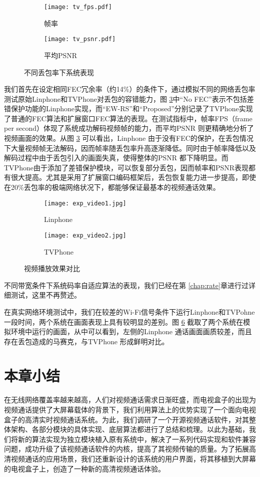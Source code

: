 \begin{figure}[htbp]
  \begin{subfigure}[b]{0.5\textwidth}
    \centering
    \texttt{[image: tv\_fps.pdf]}
    \caption{帧率}
    \label{pic:tv_fps}
  \end{subfigure}
  \begin{subfigure}[b]{0.5\textwidth}
    \centering
    \texttt{[image: tv\_psnr.pdf]}
    \caption{平均PSNR}
    \label{pic:tv_psnr}
  \end{subfigure}
  \caption{不同丢包率下系统表现}
  \label{fig:tv_loss}
\end{figure}

我们首先在设定相同FEC冗余率（约14\%）的条件下，通过模拟不同的网络丢包率测试原始Linphone和TVPhone对丢包的容错能力，图 \ref{fig:tv_loss}中``No FEC''表示不包括差错保护功能的Linphone实现，而``EW-RS''和``Proposed''分别记录了TVPhone实现了普通的FEC算法和扩展窗口FEC算法的表现。在测试指标中，帧率FPS（frame per second）体现了系统成功解码视频帧的能力，而平均PSNR 则更精确地分析了视频画面的效果。从图 \ref{fig:tv_loss} 可以看出，Linphone 由于没有FEC的保护，在丢包情况下大量视频帧无法解码，因而帧率随丢包率升高逐渐降低。同时由于帧率降低以及解码过程中由于丢包引入的画面失真，使得整体的PSNR 都下降明显。而TVPhone由于添加了差错保护模块，可以恢复部分丢包，因而帧率和PSNR表现都有很大提高。尤其是采用了扩展窗口编码框架后，丢包恢复能力进一步提高，即使在20\%丢包率的极端网络状况下，都能够保证最基本的视频通话效果。

\begin{figure}[htbp]
  \begin{subfigure}[b]{0.5\textwidth}
    \centering
    \texttt{[image: exp\_video1.jpg]}
    \caption{Linphone}
    \label{pic:tv_fps}
  \end{subfigure}
  \begin{subfigure}[b]{0.5\textwidth}
    \centering
    \texttt{[image: exp\_video2.jpg]}
    \caption{TVPhone}
    \label{pic:tv_psnr}
  \end{subfigure}
  \caption{视频播放效果对比}
  \label{fig:exp_video}
\end{figure}

不同带宽条件下系统码率自适应算法的表现，我们已经在第 \ref{chap:rate}章进行过详细测试，这里不再赘述。

在真实网络环境测试中，我们在较差的Wi-Fi信号条件下运行Linphone和TVPohne一段时间，两个系统在画面表现上具有较明显的差别。图 \ref{fig:exp_video} 截取了两个系统在模拟环境中运行的画面，从中可以看到，左侧的Linphone 通话画面画质较差，而且存在丢包造成的马赛克，与TVPhone 形成鲜明对比。

\section{本章小结}
在无线网络覆盖率越来越高，人们对视频通话需求日渐旺盛，而电视盒子的出现为视频通话提供了大屏幕载体的背景下，我们利用算法上的优势实现了一个面向电视盒子的高清实时视频通话系统。为此，我们调研了一个开源视频通话软件，对其整体架构、各部分模块的具体实现、底层算法都进行了总结和梳理。以此为基础，我们将新的算法实现为独立模块植入原有系统中，解决了一系列代码实现和软件兼容问题，成功升级了该视频通话软件的内核，提高了其视频传输的质量。为了拓展高清视频通话的应用场景，我们还重新设计的该系统的用户界面，将其移植到大屏幕的电视盒子上，创造了一种新的高清视频通话体验。
